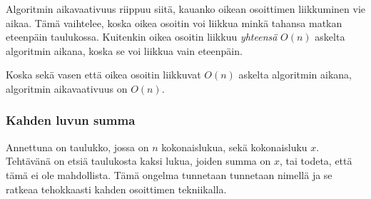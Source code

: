 \begin{center}
\end{center}

% 
% 

Algoritmin aikavaativuus riippuu siitä,
kauanko oikean osoittimen liikkuminen vie aikaa.
Tämä vaihtelee, koska oikea osoitin voi liikkua
minkä tahansa matkan eteenpäin taulukossa.
Kuitenkin oikea osoitin liikkuu \textit{yhteensä}
$O(n)$ askelta algoritmin aikana, koska se voi
liikkua vain eteenpäin.

Koska sekä vasen että oikea osoitin liikkuvat
$O(n)$ askelta algoritmin aikana,
algoritmin aikavaativuus on $O(n)$.

\subsubsection{Kahden luvun summa}


Annettuna on taulukko, jossa on $n$ kokonaislukua,
sekä kokonaisluku $x$.
Tehtävänä on etsiä taulukosta kaksi lukua,
joiden summa on $x$, tai todeta,
että tämä ei ole mahdollista.
Tämä ongelma tunnetaan tunnetaan nimellä
 ja se ratkeaa tehokkaasti
kahden osoittimen tekniikalla.


